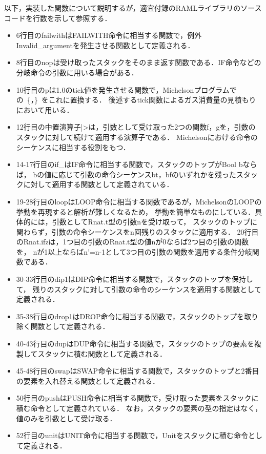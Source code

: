 \documentclass{kuisthesis}
\begin{document}
以下，実装した関数について説明するが，適宜付録のRAMLライブラリのソースコードを行数を示して参照する．
\begin{itemize}
  \item 6行目のfailwithはFAILWITH命令に相当する関数で，例外\\Invalid\_argumentを発生させる関数として定義される．
  \item 8行目のnopは受け取ったスタックをそのまま返す関数である．IF命令などの分岐命令の引数に用いる場合がある．
  \item 10行目のpは1.0のtick値を発生させる関数で，Michelsonプログラムでの\ \{，\}\ をこれに置換する．
  後述するtick関数によるガス消費量の見積もりにおいて用いる．
  \item 12行目の中置演算子|>は，引数として受け取った2つの関数f，gを，引数のスタックに対して続けて適用する演算子である．
  Michelsonにおける命令のシーケンスに相当する役割をもつ．
  \item 14-17行目のif\_はIF命令に相当する関数で，スタックのトップがBool bならば，
  bの値に応じて引数の命令シーケンスbt，bfのいずれかを残ったスタックに対して適用する関数として定義されている．
  \item 19-28行目のloopはLOOP命令に相当する関数であるが，MichelsonのLOOPの挙動を再現すると解析が難しくなるため，
  挙動を簡単なものにしている．具体的には，引数としてRnat.t型の引数nを受け取って，
  スタックのトップに関わらず，引数の命令シーケンスをn回残りのスタックに適用する．
  20行目のRnat.ifzは，1つ目の引数のRnat.t型の値nが0ならば2つ目の引数の関数を，
  nが1以上ならばn'=n-1として3つ目の引数の関数を適用する条件分岐関数である．
  \item 30-33行目のdip1はDIP命令に相当する関数で，スタックのトップを保持して，
  残りのスタックに対して引数の命令のシーケンスを適用する関数として定義される．
  \item 35-38行目のdrop1はDROP命令に相当する関数で，スタックのトップを取り除く関数として定義される．
  \item 40-43行目のdupはDUP命令に相当する関数で，スタックのトップの要素を複製してスタックに積む関数として定義される．
  \item 45-48行目のswapはSWAP命令に相当する関数で，スタックのトップと2番目の要素を入れ替える関数として定義される．
  \item 50行目のpushはPUSH命令に相当する関数で，受け取った要素をスタックに積む命令として定義されている．
  なお，スタックの要素の型の指定はなく，値のみを引数として受け取る．
  \item 52行目のunitはUNIT命令に相当する関数で，Unitをスタックに積む命令として定義される．

\end{itemize}
\end{document}

